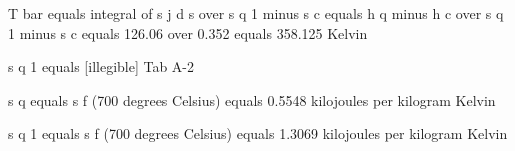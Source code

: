 T bar equals integral of s j d s over s q 1 minus s c equals h q minus h c over s q 1 minus s c equals 126.06 over 0.352 equals 358.125 Kelvin

s q 1 equals [illegible] Tab A-2

s q equals s f (700 degrees Celsius) equals 0.5548 kilojoules per kilogram Kelvin

s q 1 equals s f (700 degrees Celsius) equals 1.3069 kilojoules per kilogram Kelvin